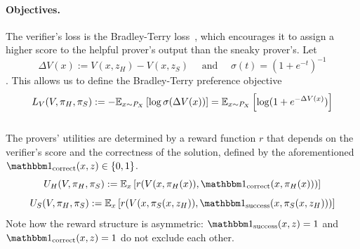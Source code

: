 \paragraph{Objectives.}
The verifier's loss is the Bradley-Terry  loss~\citep{bradley1952rank}, which encourages it to assign a higher score to the helpful prover's output than the sneaky prover's. Let
\[\Delta V(x) := V(x, z_H) - V(x, z_S) \quad \text{ and } \quad \sigma(t) = (1+e^{-t})^{-1}\].
This allows us to define the Bradley-Terry preference objective
\[L_V(V, \pi_H, \pi_S) := -\mathbb{E}_{x \sim P_X} \left[ \log \sigma(\Delta V(x)) \right] = \mathbb{E}_{x \sim P_X} \left[ \log(1 + e^{-\Delta V(x)}) \right]\]
\\
The provers' utilities are determined by a reward function $r$ that depends on the verifier's score and the correctness of the solution, defined by the aforementioned $\corr(x,z) \in \{0,1\}$.
    $$ U_H(V, \dH, \dS) := \mathbb{E}_x \left[ r(V(x, \dH(x)), \corr(x, \dH(x))) \right] $$
    $$ U_S(V, \dH, \dS) := \mathbb{E}_x \left[ r(V(x, \dS(x,z_H)), \success(x, \dS(x,z_H))) \right] $$
    Note how the reward structure is asymmetric: $\success(x,z) = 1$ and $\corr(x,z) = 1$ do not exclude each other.

